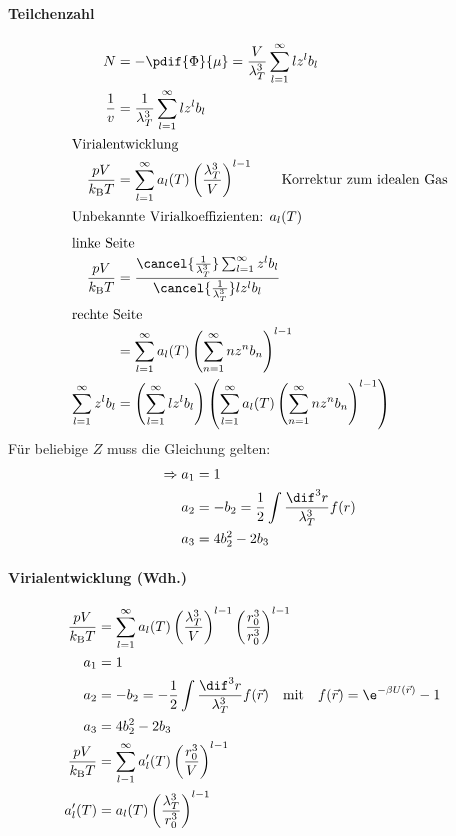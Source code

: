 \paragraph{Teilchenzahl}
\begin{align}
    N &= -\pdif{\Phi}{\mu} = \frac{V}{\lambda_T^3} \sum_{l=1}^{\infty} l z^l b_l\\
    \frac{1}{v} &= \frac{1}{\lambda_T^3} \sum_{l=1}^\infty l z^l  b_l\\
\intertext{Virialentwicklung}
    \frac{pV}{k_\text{B}T} &= \sum_{l=1}^{\infty} a_l(T) \left(\frac{\lambda_T^3}{V} \right)^{l-1} \qquad \text{Korrektur zum idealen Gas}\\
\intertext{Unbekannte Virialkoeffizienten: $a_l(T)$}  
\intertext{linke Seite}
    \frac{pV}{k_\text{B} T} &= \frac{\cancel{\frac{1}{\lambda_T^3}} \sum_{l=1}^{\infty} z^l b_l}{\cancel{\frac{1}{\lambda_T^3}} l z^l b_l} \\
\intertext{rechte Seite}
    &= \sum_{l=1}^\infty a_l(T) \left(\sum_{n=1}^\infty n z^n b_n\right)^{l-1}\\
    \sum_{l=1}^\infty z^l b_l &= \left( \sum_{l=1}^\infty l z^l b_l\right)\left(\sum_{l=1}^\infty a_l(T) \left(\sum_{n=1}^\infty n z^n b_n\right)^{l-1}\right)
\end{align}
Für beliebige $Z$  muss die Gleichung gelten:
\begin{align}
    \Rightarrow a_1&=1\\
    a_2&=-b_2=\frac{1}{2}\int \frac{\dif^3 r}{\lambda_T^3} f(r)\\
    a_3 &= 4 b_2^2 - 2 b_3
\end{align}
\paragraph{Virialentwicklung (Wdh.)}
\begin{align}
    \frac{pV}{k_\text{B} T} &= \sum_{l=1}^{\infty} a_l(T) \left(\frac{\lambda_T^3}{V} \right)^{l-1} \left(\frac{r_0^3}{r_0^3}\right)^{l-1} \\
    a_1 &= 1\\
    a_2 &= -b_2 = -\frac12\int \frac{\dif^3 r}{\lambda_T^3} f(\vec r) \quad \text{mit} \quad f(\vec r) = \e^{-\beta U(\vec r)} -1 \\
    a_3 &= 4b_2^2 -2b_3\\
    \frac{pV}{k_\text{B} T} &= \sum_{l-1}^{\infty} a_l'(T) \left( \frac{r_0^3}{V} \right)^{l-1} & \\
    a_l'(T) &= a_l(T) \left(\frac{\lambda_T^3}{r_0^3} \right)^{l-1} \\ 
\end{align}

